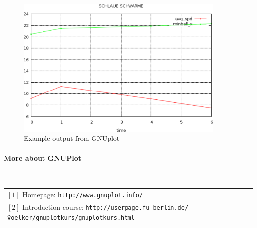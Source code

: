 \begin{figure}
	\includegraphics[width=0.9\textwidth]{stats-howto-gnuplot.png}
	\caption{Example output from GNUplot}
\end{figure}


\paragraph{More about GNUPlot}~\\

\begin{tabular}{l}
 $[1]$ Homepage: \texttt{\scriptsize http://www.gnuplot.info/} \\
 $[2]$ Introduction course: \texttt{\scriptsize http://userpage.fu-berlin.de/\~voelker/gnuplotkurs/gnuplotkurs.html}
\end{tabular}